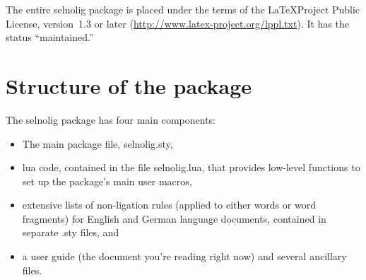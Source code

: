 \documentclass[12pt]{article}
\newcommand{\pkg}[1]{\textsf{#1}}
\begin{document}
The entire \pkg{selnolig} package is placed under the terms of the \LaTeX Project Public License, version~1.3 or later (\url{http://www.latex-project.org/lppl.txt}).
It has the status \enquote{maintained.}


\section{Structure of the package}

The \pkg{selnolig} package has four main components:
\begin{itemize}
\item The main package file, \pkg{selnolig.sty},
\item lua code, contained in the file \pkg{selnolig.lua}, that provides low-level functions to set up the package's main user macros,
\item extensive lists of non-ligation rules (applied to either words or word fragments) for English and German language documents, contained in separate \pkg{.sty} files, and
\item a user guide (the document you're reading right now) and several ancillary files.
\end{itemize}
\end{document}
